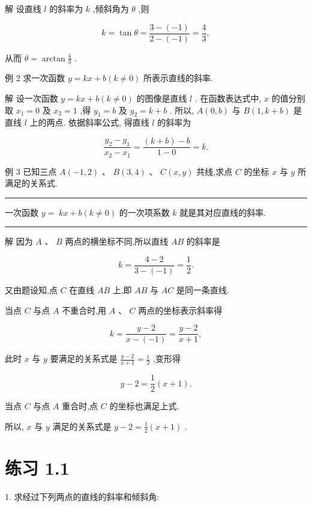\documentclass[10pt]{article}
\newcommand{\HRule}{\begin{center}\rule{0.9\linewidth}{0.2mm}\end{center}}
\begin{document}
解 设直线 \(l\) 的斜率为 \(k\) ,倾斜角为 \(\theta\) ,则

\[
k = \tan \theta  = \frac{3 - \left( {-1}\right) }{2 - \left( {-1}\right) } = \frac{4}{3},
\]

从而 \(\theta  = \arctan \frac{4}{3}\) .

例 2 求一次函数 \(y = {kx} + b\left( {k \neq  0}\right)\) 所表示直线的斜率.

解 设一次函数 \(y = {kx} + b\left( {k \neq  0}\right)\) 的图像是直线 \(l\) . 在函数表达式中, \(x\) 的值分别取 \({x}_{1} = 0\) 及 \({x}_{2} = 1\) ,得 \({y}_{1} = b\) 及 \({y}_{2} = k + b\) . 所以, \(A\left( {0,b}\right)\) 与 \(B\left( {1,k + b}\right)\) 是直线 \(l\) 上的两点. 依据斜率公式, 得直线 \(l\) 的斜率为

\[
\frac{{y}_{2} - {y}_{1}}{{x}_{2} - {x}_{1}} = \frac{\left( {k + b}\right)  - b}{1 - 0} = k.
\]

例 3 已知三点 \(A\left( {-1,2}\right) \text{ 、 }B\left( {3,4}\right) \text{ 、 }C\left( {x,y}\right)\) 共线,求点 \(C\) 的坐标 \(x\) 与 \(y\) 所满足的关系式.

\HRule

一次函数 \(y = \; {kx} + b\left( {k \neq  0}\right)\) 的一次项系数 \(k\) 就是其对应直线的斜率.

\HRule

解 因为 \(A\text{ 、 }B\) 两点的横坐标不同,所以直线 \({AB}\) 的斜率是

\[
k = \frac{4 - 2}{3 - \left( {-1}\right) } = \frac{1}{2}.
\]

又由题设知,点 \(C\) 在直线 \({AB}\) 上,即 \({AB}\) 与 \({AC}\) 是同一条直线.

当点 \(C\) 与点 \(A\) 不重合时,用 \(A\text{ 、 }C\) 两点的坐标表示斜率得

\[
k = \frac{y - 2}{x - \left( {-1}\right) } = \frac{y - 2}{x + 1},
\]

此时 \(x\) 与 \(y\) 要满足的关系式是 \(\frac{y - 2}{x + 1} = \frac{1}{2}\) ,变形得

\[
y - 2 = \frac{1}{2}\left( {x + 1}\right) .
\]

当点 \(C\) 与点 \(A\) 重合时,点 \(C\) 的坐标也满足上式.

所以, \(x\) 与 \(y\) 满足的关系式是 \(y - 2 = \frac{1}{2}\left( {x + 1}\right)\) .

\section*{练习 1.1}

1. 求经过下列两点的直线的斜率和倾斜角:
\end{document}
